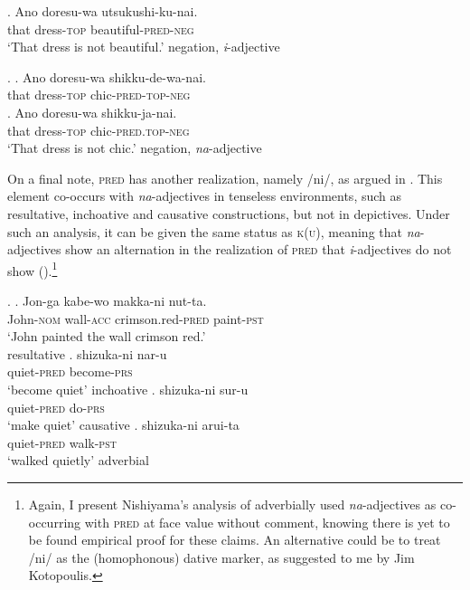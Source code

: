 \exg. Ano doresu-wa utsukushi-ku-nai.\\
that dress-\textsc{top} beautiful-\textsc{pred-neg}\\
`That dress is not beautiful.' \null \hfill negation, \textit{i}-adjective \label{negation i}

\ex. \ag.  Ano doresu-wa shikku-de-wa-nai.\\
that dress-\textsc{top} chic-\textsc{pred-top-neg} \label{negation na long}\\
\bg. Ano doresu-wa shikku-ja-nai.\\
that dress-\textsc{top} chic-\textsc{pred.top-neg}\\
`That dress is not chic.' \null \hfill negation, \textit{na}-adjective \label{negation na short}

On a final note, \textsc{pred} has another realization, namely /ni/, as argued in \citet{nishiyama:1999:adj}. This element co-occurs with \textit{na}-adjectives in tenseless environments, such as resultative, inchoative and causative constructions, but not in depictives. Under such an analysis, it can be given the same status as \textsc{k(u)}, meaning that \textit{na}-adjectives show an alternation in the realization of \textsc{pred} that \textit{i}-adjectives do not show (\citealt[205–208]{nishiyama:1999:adj}).\footnote{Again, I present Nishiyama’s analysis of adverbially used \textit{na}-adjectives as co-occurring with \textsc{pred} at face value without comment, knowing there is yet to be found empirical proof for these claims. An alternative could be to treat /ni/ as the (homophonous) dative marker, as suggested to me by Jim Kotopoulis.}

\ex. \ag. Jon-ga kabe-wo makka-ni nut-ta.\\
John-\textsc{nom} wall-\textsc{acc} crimson.red-\textsc{pred} paint-\textsc{pst}\\
`John painted the wall crimson red.’ \\ \null\hfill resultative \citep[207]{nishiyama:1999:adj}
\bg. shizuka-ni nar-u\\
quiet-\textsc{pred} become-\textsc{prs}\\
`become quiet' \null \hfill inchoative
\cg. shizuka-ni sur-u\\
quiet-\textsc{pred} do-\textsc{prs}\\
`make quiet' \null \hfill causative
\dg. shizuka-ni arui-ta\\
quiet-\textsc{pred} walk-\textsc{pst}\\
`walked quietly' \null\hfill adverbial \citep[150]{nishiyama:2005:baker}

